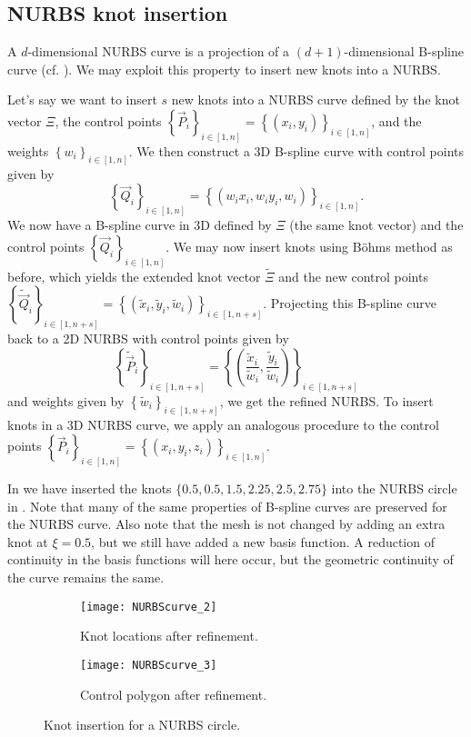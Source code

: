 \subsection{NURBS knot insertion}
A $d$-dimensional NURBS curve is a projection of a $(d+1)$-dimensional B-spline curve (cf. \cite{Cottrell2009iat}). We may exploit this property to insert new knots into a NURBS. 

Let's say we want to insert $s$ new knots into a NURBS curve defined by the knot vector $\Xi$, the control points $\left\{\vec{P}_i\right\}_{i\in[1,n]}=\left\{(x_i,y_i)\right\}_{i\in[1,n]}$, and the weights $\left\{w_i\right\}_{i\in[1,n]}$. We then construct a 3D B-spline curve with control points given by
\begin{equation*}
	\left\{\vec{Q}_i\right\}_{i\in[1,n]} = \left\{(w_i x_i, w_i y_i, w_i)\right\}_{i\in[1,n]}.
\end{equation*}
We now have a B-spline curve in 3D defined by $\Xi$ (the same knot vector) and the control points $\left\{\vec{Q}_i\right\}_{i\in[1,n]}$. We may now insert knots using B\"{o}hms method as before, which yields the extended knot vector $\tilde{\Xi}$ and the new control points $\left\{\tilde{\vec{Q}}_i\right\}_{i\in[1,n+s]} = \left\{(\tilde{x}_i, \tilde{y}_i, \tilde{w}_i)\right\}_{i\in[1,n+s]}$. Projecting this B-spline curve back to a 2D NURBS with control points given by
\begin{equation*}
	\left\{\tilde{\vec{P}}_i\right\}_{i\in[1,n+s]} = \left\{\left(\frac{\tilde{x}_i}{\tilde{w}_i}, \frac{\tilde{y}_i}{\tilde{w}_i}\right)\right\}_{i\in[1,n+s]}
\end{equation*}
and weights given by $\left\{\tilde{w}_i\right\}_{i\in[1,n+s]}$, we get the refined NURBS. To insert knots in a 3D NURBS curve, we apply an analogous procedure to the control points $\left\{\vec{P}_i\right\}_{i\in[1,n]}=\left\{(x_i,y_i,z_i)\right\}_{i\in[1,n]}$.

In  we have inserted the knots $\{0.5, 0.5, 1.5, 2.25, 2.5, 2.75\}$ into the NURBS circle in . Note that many of the same properties of B-spline curves are preserved for the NURBS curve. Also note that the mesh is not changed by adding an extra knot at $\xi = 0.5$, but we still have added a new basis function. A reduction of continuity in the basis functions will here occur, but the geometric continuity of the curve remains the same.

\begin{figure}
	\centering    
	\begin{subfigure}{0.49\textwidth}
		\centering
		\texttt{[image: NURBScurve\_2]} 
		\caption{Knot locations after refinement.}
	\end{subfigure}%
	\hspace*{0.02\textwidth}%
	\begin{subfigure}{0.49\textwidth}
		\centering
		\texttt{[image: NURBScurve\_3]} 
		\caption{Control polygon after refinement.}
	\end{subfigure}      
	\caption{Knot insertion for a NURBS circle.}\label{Fig:NURBScurveRefined}
\end{figure}

